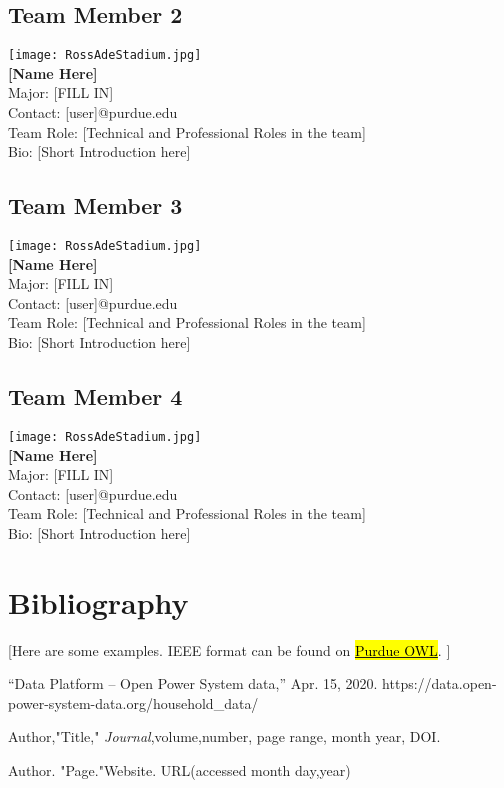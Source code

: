 \documentclass[letterpaper, 11pt]{article}
\begin{document}
\subsection{Team Member 2}
\texttt{[image: RossAdeStadium.jpg]} \\
\textbf{[Name Here]}\\
Major: [FILL IN]\\
Contact: [user]@purdue.edu\\
Team Role: [Technical and Professional Roles in the team] \\
Bio: [Short Introduction here]

\subsection{Team Member 3}
\texttt{[image: RossAdeStadium.jpg]} \\
\textbf{[Name Here]}\\
Major: [FILL IN]\\
Contact: [user]@purdue.edu\\
Team Role: [Technical and Professional Roles in the team] \\
Bio: [Short Introduction here]

\subsection{Team Member 4}
\texttt{[image: RossAdeStadium.jpg]} \\
\textbf{[Name Here]}\\
Major: [FILL IN]\\
Contact: [user]@purdue.edu\\
Team Role: [Technical and Professional Roles in the team] \\
Bio: [Short Introduction here]

\clearpage
\section{Bibliography} 

[Here are some examples. IEEE format can be found on \href{https://owl.purdue.edu/owl/research_and_citation/ieee_style/ieee_overview.html}{\hl{Purdue OWL}}. ]

\begin{thebibliography}{}

 “Data Platform – Open Power System data,” Apr. 15, 2020. https://data.open-power-system-data.org/household\_data/  

Author,"Title," \emph{Journal},volume,number, page range, month year, DOI.

Author. "Page."Website. URL(accessed month day,year)

\end{thebibliography}
\end{document}

